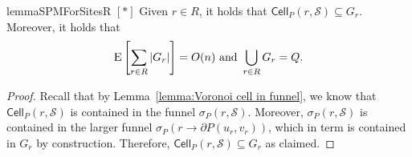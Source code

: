 \documentclass[a4paper,UKenglish]{socg-lipics-v2018}
\newcommand{\s}{\mathcal S}
\newcommand{\funnel}[2][P]{\ensuremath{\sigma_{\scriptscriptstyle #1}(#2)}}
\newcommand{\cell}[2][P]{\ensuremath{\mathsf{Cell}_{\scriptscriptstyle #1}(#2)}}
\newcommand{\bcell}[2][P]{\ensuremath{\partial_{\scriptscriptstyle #1}(#2)}}
\newcommand{\ex}[1]{\textsc{E}\left[#1\right]}
\begin{document}
\begin{restatable}{lemma}{SPMForSitesR}\label{lemma:SPMForSitesR}
$[*]$ Given $r\in R$, it holds that $\cell{r, \s}\subseteq G_r$. 
Moreover, it holds that 
\[ \ex{\sum_{r\in R} |G_r|} = O(n)\text{ and }\bigcup_{r\in R} G_r = Q.\]
\end{restatable}

\begin{proof}
Recall that by Lemma~\ref{lemma:Voronoi cell in funnel}, we know that $\cell{r, \s}$ is contained in the funnel $\funnel{r, \s}$.
Moreover, $\funnel{r, \s}$ is contained in the larger funnel $\funnel{r\to  \partial P(u_r, v_r)}$, which in term is contained in $G_r$ by construction.
Therefore, $\cell{r, \s}\subseteq G_r$ as claimed. 




\end{proof}
\end{document}
